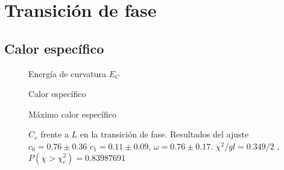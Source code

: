 \section{Transición de fase}

\subsection{Calor específico}

\begin{figure}[h]
\centering
 
\caption{Energía de curvatura $E_C$}
\end{figure}

\begin{figure}[h]
  \centering
  
  \caption{Calor específico}
\end{figure}

\begin{figure}[h]
  \centering
  
  \caption{Máximo calor específico}
\end{figure}

\begin{figure}[h]
  \centering
  
  \caption{$C_v$ frente a $L$ en la transición de fase. Resultados del ajuste
    $c_0=0.76\pm 0.36$ $c_1=0.11\pm 0.09$,  $\omega=0.76\pm
    0.17$. $\chi^2/gl=0.349/2$ , $P(\chi>\chi_c^2)=0.83987691$}







\end{figure}

